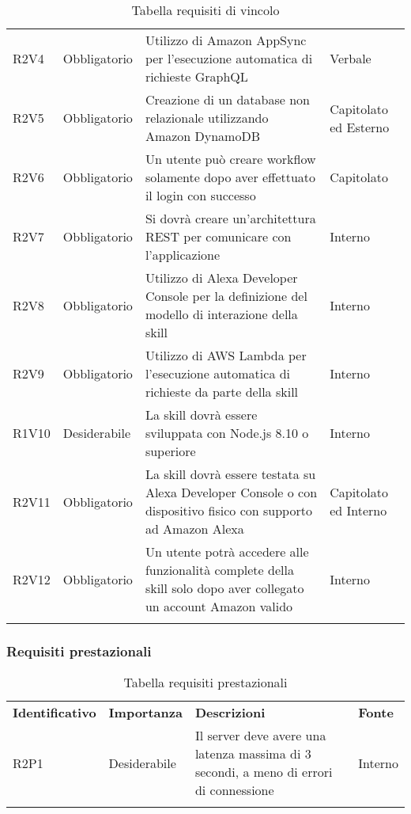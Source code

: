 \begin{center}
\begin{longtable}{  >{\RaggedRight}p{2.5cm}  
						>{\RaggedRight}p{2.1cm} 
						>{\RaggedRight}p{7cm}  
						>{\RaggedRight}p{1.7cm} 
						}
		R2V4   & Obbligatorio & Utilizzo di Amazon AppSync per l'esecuzione automatica di richieste GraphQL                                                 & Verbale               \\  
		R2V5   & Obbligatorio & Creazione di un database non relazionale utilizzando Amazon DynamoDB                                                                       & Capitolato ed Esterno \\  
		R2V6   & Obbligatorio & Un utente può creare workflow solamente dopo aver effettuato il login con successo                                                         & Capitolato            \\
		R2V7   & Obbligatorio & Si dovrà creare un'architettura REST per comunicare con l'applicazione                                                              & Interno    \\
		R2V8	& Obbligatorio & Utilizzo di  Alexa Developer Console per la definizione del modello di interazione della skill	& Interno \\
		R2V9	& Obbligatorio & Utilizzo di AWS Lambda per l'esecuzione automatica di richieste da parte della skill	& Interno \\
		R1V10	& Desiderabile & La skill dovrà essere sviluppata con Node.js 8.10 o superiore	& Interno \\
		R2V11	& Obbligatorio	& La skill dovrà essere testata su Alexa Developer Console o con dispositivo fisico con supporto ad Amazon Alexa	& Capitolato ed Interno \\
		R2V12	& Obbligatorio	& Un utente potrà accedere alle funzionalità complete della skill solo dopo aver collegato un account Amazon valido	& Interno \\
		
		\rowcolor{white}		
		\caption{Tabella requisiti di vincolo}
	\end{longtable}
\end{center}
\subsubsection{Requisiti prestazionali}
\begin{center}
	\renewcommand{\arraystretch}{1.5}
	\begin{longtable}{  >{\RaggedRight}p{2.5cm}  
						>{\RaggedRight}p{2.1cm} 
						>{\RaggedRight}p{7cm}  
						>{\RaggedRight}p{1.7cm} 
						}

		\rowcolor{tableHeadYellow}

		\textbf{Identificativo}   & \textbf{Importanza} & \textbf{Descrizioni} & \textbf{Fonte} \\ 

		R2P1 & Desiderabile & Il server deve avere una latenza massima di 3 secondi, a meno di errori di connessione                     & Interno \\  
		
		\rowcolor{white}
		\caption{Tabella requisiti prestazionali}
	\end{longtable}
\end{center}

